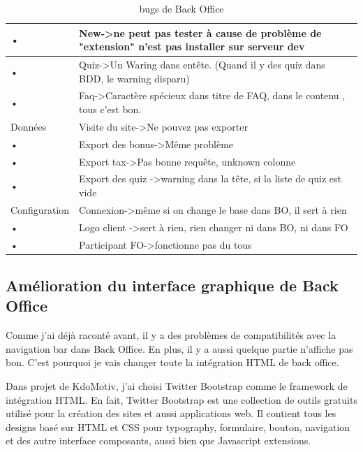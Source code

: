 \begin{table}[htbp]
\begin{tabularx}{\textwidth}{lX}
 \\ 
\hline 
• & New-\textgreater ne peut pas tester à cause de problème de "extension"  n'est pas installer sur serveur dev
 \\ 
\hline 
• & Quiz-\textgreater Un Waring dans entête.  (Quand il y des quiz dans BDD, le warning disparu)  
 \\ 
\hline 
• & Faq-\textgreater Caractère spécieux dans titre de FAQ, dans le contenu , tous c'est bon.   
 \\ 
\hline 
Données
 & Visite du site-\textgreater Ne pouvez pas exporter
 \\ 
\hline 
• & Export des bonus-\textgreater Même problème
 \\ 
\hline 
• & Export tax-\textgreater Pas bonne requête, unknown colonne
 \\ 
\hline 
• & Export des quiz -\textgreater warning dans la tête, si la liste de quiz est vide
 \\ 
\hline 
Configuration
 & Connexion-\textgreater même si on change le base dans BO, il sert à rien
 \\ 
\hline 
• & Logo client -\textgreater sert à rien, rien changer ni dans BO, ni dans FO
 \\ 
\hline 
• & Participant FO-\textgreater fonctionne pas du tous
 \\ 
\hline 
\end{tabularx} 
 \caption{bugs de Back Office}
\end{table}  


\newpage

\subsection{Amélioration du interface graphique de Back Office}
Comme j'ai déjà raconté avant, il y a des problèmes de compatibilités avec la navigation bar dans Back Office. En plus, il y a aussi quelque partie n'affiche pas bon. C'est pourquoi je vais changer toute la intégration HTML de back office.

Dans projet de KdoMotiv, j'ai choisi Twitter Bootstrap comme le framework de intégration HTML. En fait, Twitter Bootstrap est une collection de outils gratuits utilisé pour la création des sites et aussi applications web. Il contient tous les designs basé sur HTML et CSS pour typography, formulaire, bouton, navigation et des autre interface composants, aussi bien que Javascript extensions.

